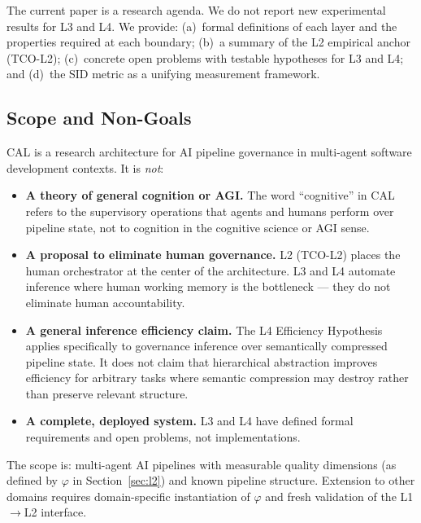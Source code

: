 \documentclass[11pt]{article}
\theoremstyle{definition}
\theoremstyle{remark}
\begin{document}
The current paper is a research agenda. We do not report new
experimental results for L3 and L4. We provide: (a)~formal
definitions of each layer and the properties required at each
boundary; (b)~a summary of the L2 empirical anchor (TCO-L2);
(c)~concrete open problems with testable hypotheses for L3 and L4;
and (d)~the SID metric as a unifying measurement framework.

\subsection{Scope and Non-Goals}

CAL is a research architecture for AI pipeline governance in
multi-agent software development contexts. It is \emph{not}:

\begin{itemize}[leftmargin=1.5em]
  \item \textbf{A theory of general cognition or AGI.} The word
    ``cognitive'' in CAL refers to the supervisory operations that
    agents and humans perform over pipeline state, not to cognition
    in the cognitive science or AGI sense.

  \item \textbf{A proposal to eliminate human governance.} L2
    (TCO-L2) places the human orchestrator at the center of the
    architecture. L3 and L4 automate inference where human working
    memory is the bottleneck --- they do not eliminate human
    accountability.

  \item \textbf{A general inference efficiency claim.} The L4
    Efficiency Hypothesis applies specifically to governance
    inference over semantically compressed pipeline state. It does
    not claim that hierarchical abstraction improves efficiency for
    arbitrary tasks where semantic compression may destroy rather
    than preserve relevant structure.

  \item \textbf{A complete, deployed system.} L3 and L4 have
    defined formal requirements and open problems, not
    implementations.
\end{itemize}

The scope is: multi-agent AI pipelines with measurable quality
dimensions (as defined by $\varphi$ in Section~\ref{sec:l2}) and
known pipeline structure. Extension to other domains requires
domain-specific instantiation of $\varphi$ and fresh validation of
the L1$\to$L2 interface.

\end{document}
